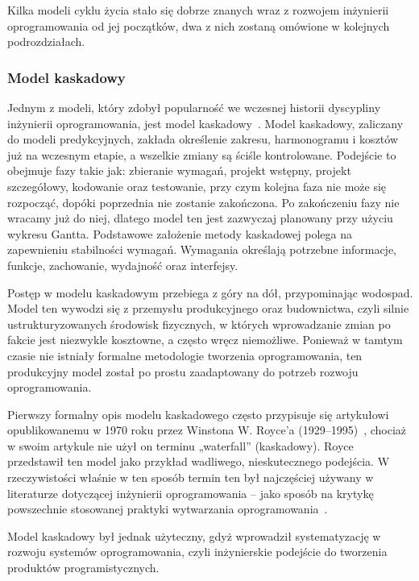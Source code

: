 Kilka modeli cyklu życia stało się dobrze znanych wraz z rozwojem inżynierii oprogramowania od jej początków, dwa z nich zostaną omówione w kolejnych podrozdziałach.

\subsubsection{Model kaskadowy}

Jednym z modeli, który zdobył popularność we wczesnej historii dyscypliny inżynierii oprogramowania, jest model kaskadowy~\autocite{sommerville2015software}. Model kaskadowy, zaliczany do modeli predykcyjnych, zakłada określenie zakresu, harmonogramu i kosztów już na wczesnym etapie, a wszelkie zmiany są ściśle kontrolowane. Podejście to obejmuje fazy takie jak: zbieranie wymagań, projekt wstępny, projekt szczegółowy, kodowanie oraz testowanie, przy czym kolejna faza nie może się rozpocząć, dopóki poprzednia nie zostanie zakończona. \autocite{swebok} Po zakończeniu fazy nie wracamy już do niej, dlatego model ten jest zazwyczaj planowany przy użyciu wykresu Gantta. Podstawowe założenie metody kaskadowej polega na zapewnieniu stabilności wymagań. Wymagania określają potrzebne informacje, funkcje, zachowanie, wydajność oraz interfejsy.\autocite{arora2016analysis}

Postęp w modelu kaskadowym przebiega z góry na dół, przypominając wodospad. Model ten wywodzi się z przemysłu produkcyjnego oraz budownictwa, czyli silnie ustrukturyzowanych środowisk fizycznych, w których wprowadzanie zmian po fakcie jest niezwykle kosztowne, a często wręcz niemożliwe. Ponieważ w tamtym czasie nie istniały formalne metodologie tworzenia oprogramowania, ten produkcyjny model został po prostu zaadaptowany do potrzeb rozwoju oprogramowania.\autocite{SDLC}

Pierwszy formalny opis modelu kaskadowego często przypisuje się artykułowi opublikowanemu w 1970 roku przez Winstona W. Royce'a (1929–1995)~\autocite{royce1970}, chociaż w swoim artykule nie użył on terminu „waterfall” (kaskadowy). Royce przedstawił ten model jako przykład wadliwego, nieskutecznego podejścia. W rzeczywistości właśnie w ten sposób termin ten był najczęściej używany w literaturze dotyczącej inżynierii oprogramowania – jako sposób na krytykę powszechnie stosowanej praktyki wytwarzania oprogramowania~\autocite{SDLC}.

Model kaskadowy był jednak użyteczny, gdyż wprowadził systematyzację w rozwoju systemów oprogramowania, czyli inżynierskie podejście do tworzenia produktów programistycznych.\autocite{swebok}

